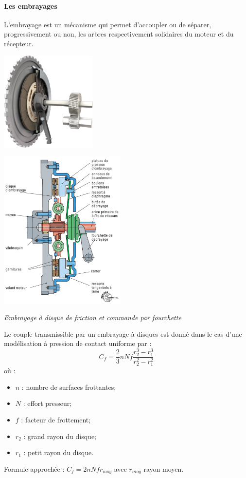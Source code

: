 \documentclass[11pt,oneside]{article}
\begin{document}
\paragraph{Les embrayages}

L’embrayage est un mécanisme qui permet d’accoupler ou de séparer, progressivement ou non, les arbres respectivement solidaires du moteur et du récepteur.

\begin{minipage}[c]{.45\linewidth}
\begin{center}
\includegraphics[height=5cm]{png/fig_23}
\end{center}
\end{minipage} \hfill
\begin{minipage}[c]{.45\linewidth}
\begin{center}
\includegraphics[height=8cm]{png/fig_24}
\end{center}
\end{minipage}

\begin{center}
\textit{Embrayage à disque de friction et commande par fourchette}
\end{center}


Le couple transmissible par un embrayage à disques est donné dans le cas d’une modélisation à pression de contact uniforme par : 
$$
C_f = \dfrac{2}{3} n N f \dfrac{r_2^3-r_1^3}{r_2^2-r_1^2}
$$ 
où :
\begin{itemize}
\item $n$ : nombre de surfaces frottantes;
\item $N$ : effort presseur;
\item $f$ : facteur de frottement;
\item $r_2$ : grand rayon du disque;
\item $r_1$ : petit rayon du disque.
\end{itemize}
Formule approchée :  $C_f = 2nNfr_{moy}$  avec $r_{moy}$ rayon moyen.
\end{document}
